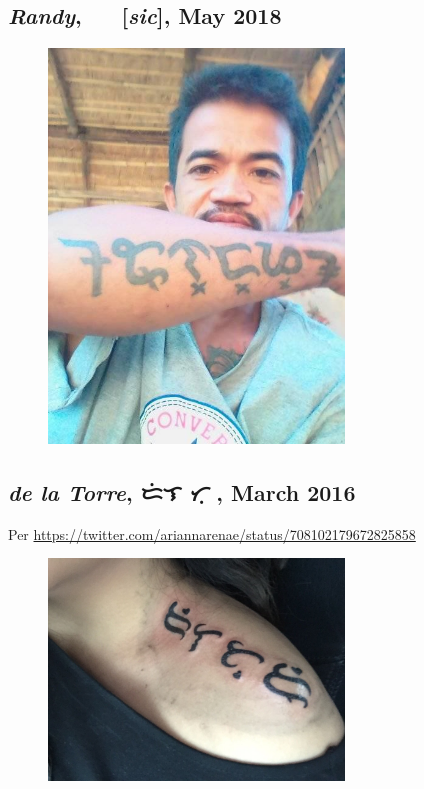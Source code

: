\documentclass[a4paper,pagesize,openany,14pt,parskip=never]{scrbook}
\newcommand{\≈}{$\approx$}
\begin{document}
\subsection{{\em Randy}, {\baybayin ᜍᜈ᜔ᜇ᜔ᜌ᜔} [{\em sic}], May 2018}
\begin{figure}[H]
\includegraphics[width=0.7\textwidth]{RANDY}
\end{figure}

\subsection{{\em de la Torre}, {\baybayin ᜇᜒᜎ ᜆᜓᜍᜒ}, March 2016}

Per \url{https://twitter.com/ariannarenae/status/708102179672825858}

\begin{figure}[H]
\includegraphics[width=0.7\textwidth]{DelaTorre}
\end{figure}
\end{document}
